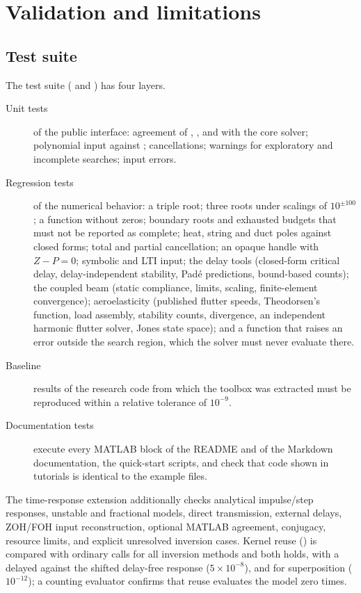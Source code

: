 \chapter{Validation and limitations}\label{ch:validation}

\section{Test suite}

The test suite ( and ) has four
layers.
\begin{description}
  \item[Unit tests] of the public interface: agreement of ,
    ,  and  with the core solver;
    polynomial input against ; cancellations; warnings for
    exploratory and incomplete searches; input errors.
  \item[Regression tests] of the numerical behavior: a triple root; three
    roots under scalings of $10^{\pm100}$; a function without zeros;
    boundary roots and exhausted budgets that must not be reported as
    complete; heat, string and duct poles against closed forms; total and
    partial cancellation; an opaque handle with $Z-P=0$; symbolic and LTI
    input; the delay tools (closed-form critical delay, delay-independent
    stability, Padé predictions, bound-based counts); the coupled beam
    (static compliance, limits, scaling, finite-element convergence);
    aeroelasticity (published flutter speeds, Theodorsen's function,
    load assembly, stability counts, divergence, an independent harmonic
    flutter solver, Jones state space); and a function that raises an error
    outside the search region, which the solver must never evaluate there.
  \item[Baseline] results of the research code from which the toolbox was
    extracted must be reproduced within a relative tolerance of $10^{-9}$.
  \item[Documentation tests] execute every MATLAB block of the README and
    of the Markdown documentation, the quick-start scripts, and check that
    code shown in tutorials is identical to the example files.
\end{description}

The time-response extension additionally checks analytical impulse/step
responses, unstable and fractional models, direct transmission, external
delays, ZOH/FOH input reconstruction, optional MATLAB  agreement,
conjugacy, resource limits, and explicit unresolved inversion cases. Kernel
reuse () is compared with ordinary  calls for all
inversion methods and both holds, with a delayed  against the
shifted delay-free  response ($5\times10^{-8}$), and for
superposition ($10^{-12}$); a counting evaluator confirms that reuse
evaluates the model zero times.

